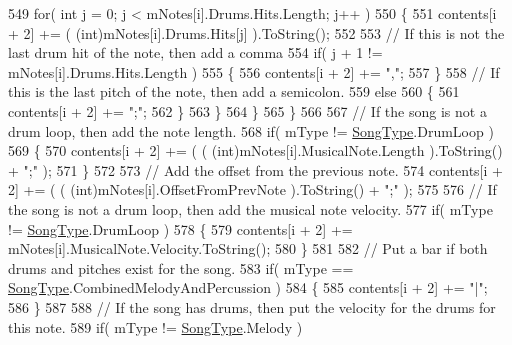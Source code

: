 \begin{DoxyCodeInclude}
549                     \textcolor{keywordflow}{for}( \textcolor{keywordtype}{int} j = 0; j < mNotes[i].Drums.Hits.Length; j++ )
550                     \{
551                         contents[i + 2] += ( (int)mNotes[i].Drums.Hits[j] ).ToString();
552 
553                         \textcolor{comment}{// If this is not the last drum hit of the note, then add a comma}
554                         \textcolor{keywordflow}{if}( j + 1 != mNotes[i].Drums.Hits.Length )
555                         \{
556                             contents[i + 2] += \textcolor{stringliteral}{","};
557                         \}
558                         \textcolor{comment}{// If this is the last pitch of the note, then add a semicolon.}
559                         \textcolor{keywordflow}{else}
560                         \{
561                             contents[i + 2] += \textcolor{stringliteral}{";"};
562                         \}
563                     \}
564                 \}
565             \}
566 
567             \textcolor{comment}{// If the song is not a drum loop, then add the note length.}
568             \textcolor{keywordflow}{if}( mType != \hyperlink{group___song_enums_gae681a1f001333e39fc1cb4fea97bfe1b}{SongType}.DrumLoop )
569             \{
570                 contents[i + 2] += ( ( (int)mNotes[i].MusicalNote.Length ).ToString() + \textcolor{stringliteral}{";"} );
571             \}
572 
573             \textcolor{comment}{// Add the offset from the previous note.}
574             contents[i + 2] += ( ( (int)mNotes[i].OffsetFromPrevNote ).ToString() + \textcolor{stringliteral}{";"} );
575 
576             \textcolor{comment}{// If the song is not a drum loop, then add the musical note velocity.}
577             \textcolor{keywordflow}{if}( mType != \hyperlink{group___song_enums_gae681a1f001333e39fc1cb4fea97bfe1b}{SongType}.DrumLoop )
578             \{
579                 contents[i + 2] += mNotes[i].MusicalNote.Velocity.ToString();
580             \}
581 
582             \textcolor{comment}{// Put a bar if both drums and pitches exist for the song.}
583             \textcolor{keywordflow}{if}( mType == \hyperlink{group___song_enums_gae681a1f001333e39fc1cb4fea97bfe1b}{SongType}.CombinedMelodyAndPercussion )
584             \{
585                 contents[i + 2] += \textcolor{stringliteral}{"|"};
586             \}
587 
588             \textcolor{comment}{// If the song has drums, then put the velocity for the drums for this note.}
589             \textcolor{keywordflow}{if}( mType != \hyperlink{group___song_enums_gae681a1f001333e39fc1cb4fea97bfe1b}{SongType}.Melody )

\end{DoxyCodeInclude}
